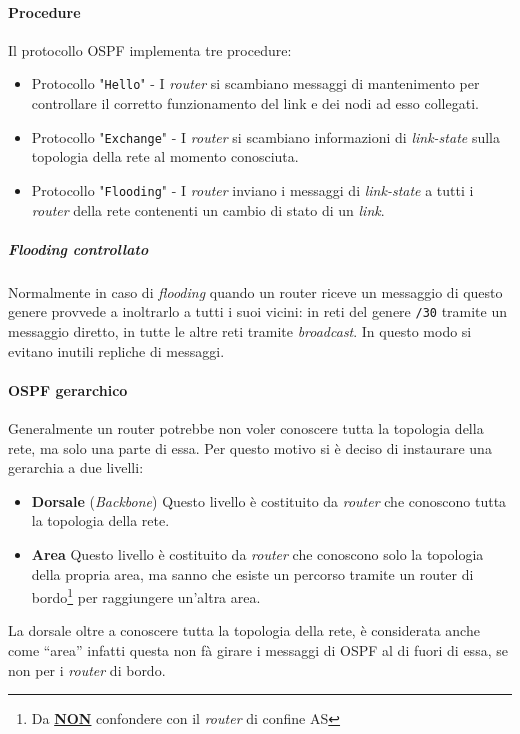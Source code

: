             \paragraph{Procedure} Il protocollo \Acrshort*{OSPF} implementa tre procedure: \begin{itemize}
                \item Protocollo "\texttt{Hello}" - I \textit{router} si scambiano messaggi di mantenimento per controllare il corretto funzionamento del link e dei nodi ad esso collegati.
                \item Protocollo "\texttt{Exchange}" - I \textit{router} si scambiano informazioni di \textit{link-state} sulla topologia della rete al momento conosciuta.
                \item Protocollo "\texttt{Flooding}" - I \textit{router} inviano i messaggi di \textit{link-state} a tutti i \textit{router} della rete contenenti un cambio di stato di un \textit{link}.
            \end{itemize}
            \subparagraph{\textit{Flooding} controllato} Normalmente in caso di \textit{flooding} quando un router riceve un messaggio di questo genere provvede a inoltrarlo a tutti i suoi vicini: in reti del genere \texttt{/30} tramite un messaggio diretto, in tutte le altre reti tramite \textit{broadcast}. In questo modo si evitano inutili repliche di messaggi.
        \paragraph{\Acrshort*{OSPF} gerarchico} Generalmente un router potrebbe non voler conoscere tutta la topologia della rete, ma solo una parte di essa. Per questo motivo si è deciso di instaurare una gerarchia a due livelli: \begin{itemize}
            \item \textbf{Dorsale} (\textit{Backbone}) Questo livello è costituito da \textit{router} che conoscono tutta la topologia della rete.
            \item \textbf{Area} Questo livello è costituito da \textit{router} che conoscono solo la topologia della propria area, ma sanno che esiste un percorso tramite un router di bordo\footnote{Da \underline{\textbf{NON}} confondere con il \textit{router} di confine \Acrshort*{AS}} per raggiungere un'altra area.
        \end{itemize}
        La dorsale oltre a conoscere tutta la topologia della rete, è considerata anche come ``area'' infatti questa non fà girare i messaggi di \Acrshort*{OSPF} al di fuori di essa, se non per i \textit{router} di bordo.
